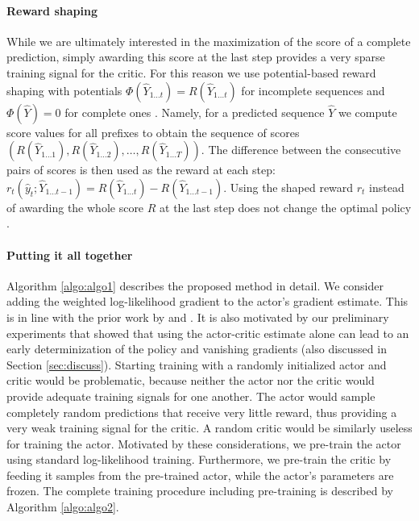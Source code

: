 \documentclass{article} %
\begin{document}
\paragraph{Reward shaping}
While we are ultimately interested in the maximization of the score of a complete
prediction, simply awarding this score at the last 
step provides a very sparse training signal for the critic. For this reason we
use potential-based reward shaping with potentials $\Phi(\hat{Y}_{1 \ldots t})
= R(\hat{Y}_{1 \ldots t})$ for incomplete sequences and $\Phi(\hat{Y}) = 0$ for
complete ones \citep{ng1999policy}. Namely, for a predicted sequence $\hat{Y}$
we compute score values for all prefixes to obtain the sequence of scores
$(R(\hat{Y}_{1\ldots 1}),R(\hat{Y}_{1\ldots 2}),\ldots,R(\hat{Y}_{1\ldots
T}))$.  The difference between the consecutive pairs of scores is then used
as the reward at each step: $r_t(\hat{y}_t;\hat{Y}_{1\ldots
t-1})=R(\hat{Y}_{1\ldots t})-R(\hat{Y}_{1\ldots t-1})$. Using the shaped reward $r_t$ 
instead of awarding the whole score $R$ at the last step does not change the 
optimal policy
\citep{ng1999policy}.
\paragraph{Putting it all together}

Algorithm \ref{algo:algo1} describes the proposed method in detail.
We consider adding the weighted
log-likelihood gradient to the actor's gradient estimate. This is in line with
the prior work by \citep{ranzato2015sequence} and \citep{shen2015minimum}. It is
also motivated by our preliminary experiments that showed that using the
actor-critic estimate alone can lead to an early determinization of the policy
and vanishing gradients (also discussed in Section \ref{sec:discuss}).
Starting training with a randomly initialized actor and critic would be
problematic,
 because neither the actor nor the critic would provide adequate
training signals for one another.
 The actor would sample completely random
predictions that receive very little reward,
 thus providing a very weak
training signal for the critic.
 A random critic would be similarly useless
for training the actor. Motivated by these considerations, 
 we pre-train the
actor using standard log-likelihood training. Furthermore, we
 pre-train the
critic by feeding it samples from the pre-trained actor, while the actor's
parameters are frozen. The complete training procedure including pre-training
is described by Algorithm \ref{algo:algo2}.
\end{document}
